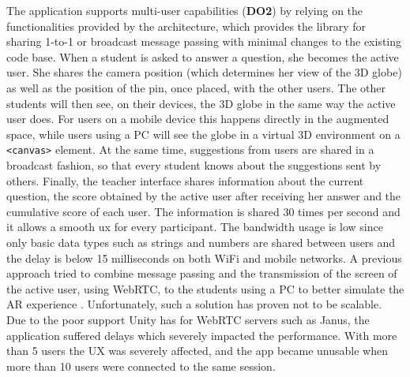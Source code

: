The application supports multi-user capabilities (\textbf{DO2}) by relying on the functionalities provided by the \arch{} architecture, which provides the \ork{} library for sharing 1-to-1 or broadcast message passing \citep{10.1007/978-3-030-93907-6_106} with minimal changes to the existing code base.
When a student is asked to answer a question, she becomes the active user. She shares the camera position (which determines her view of the 3D globe) as well as the position of the pin, once placed, with the other users.
The other students will then see, on their devices, the 3D globe in the same way the active user does.
For users on a mobile device this happens directly in the augmented space, while users using a PC will see the globe in a virtual 3D environment on a \texttt{\textless canvas\textgreater} element.
At the same time, suggestions from users are shared in a broadcast fashion, so that every student knows about the suggestions sent by others.
Finally, the teacher interface shares information about the current question, the score obtained by the active user after receiving her answer and the cumulative score of each user.
The information is shared 30 times per second and it allows a smooth \gls{ux} for every participant. The bandwidth usage is low since only basic data types such as strings and numbers are shared between users and the delay is below 15 milliseconds on both WiFi and mobile networks.
A previous approach tried to combine message passing and the transmission of the screen of the active user, using WebRTC, to the students using a PC to better simulate the AR experience \citep{UnityRenderStreaming}.
Unfortunately, such a solution has proven not to be scalable. Due to the poor support Unity has for WebRTC servers such as Janus, the application suffered delays which severely impacted the performance. With more than 5 users the UX was severely affected, and the app became unusable when more than 10 users were connected to the same session.

